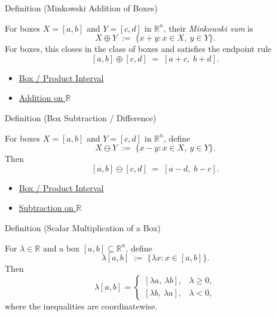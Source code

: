 \begin{definitionbox}{Definition (Minkowski Addition of Boxes)}
\begin{definition}\label{def:box-add}
For boxes $X=[a,b]$ and $Y=[c,d]$ in $\mathbb{R}^n$, their \emph{Minkowski sum} is
\[
X\oplus Y \;:=\; \{x+y : x\in X,\ y\in Y\}.
\]
For boxes, this closes in the class of boxes and satisfies the endpoint rule
\[
[a,b]\oplus[c,d] \;=\; [a+c,\; b+d].
\]
\end{definition}
\end{definitionbox}

\begin{dependencies}
\begin{itemize}
  \item \hyperref[def:box]{Box / Product Interval}
  \item \hyperref[def:addition-on-r]{Addition on $\mathbb{R}$}
\end{itemize}
\end{dependencies}

\begin{definitionbox}{Definition (Box Subtraction / Difference)}
\begin{definition}\label{def:box-sub}
For boxes $X=[a,b]$ and $Y=[c,d]$ in $\mathbb{R}^n$, define
\[
X\ominus Y \;:=\; \{x-y : x\in X,\ y\in Y\}.
\]
Then
\[
[a,b]\ominus[c,d] \;=\; [a-d,\; b-c].
\]
\end{definition}
\end{definitionbox}

\begin{dependencies}
\begin{itemize}
  \item \hyperref[def:box]{Box / Product Interval}
  \item \hyperref[def:subtraction-on-r]{Subtraction on $\mathbb{R}$}
\end{itemize}
\end{dependencies}

\begin{definitionbox}{Definition (Scalar Multiplication of a Box)}
\begin{definition}\label{def:box-smul}
For $\lambda\in\mathbb{R}$ and a box $[a,b]\subseteq\mathbb{R}^n$, define
\[
\lambda[a,b] \;:=\; \{\lambda x : x\in[a,b]\}.
\]
Then
\[
\lambda[a,b]=
\begin{cases}
[\lambda a,\ \lambda b], & \lambda\ge 0,\\[4pt]
[\lambda b,\ \lambda a], & \lambda<0,
\end{cases}
\]
where the inequalities are coordinatewise.
\end{definition}
\end{definitionbox}

